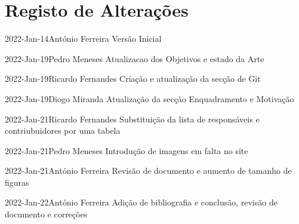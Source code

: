 \chapter*{Registo de Alterações}

\begin{logentry}{2022-Jan-14}{António Ferreira}
Versão Inicial
\end{logentry}

\begin{logentry}{2022-Jan-19}{Pedro Meneses}
Atualizacao dos Objetivos e estado da Arte
\end{logentry}

\begin{logentry}{2022-Jan-19}{Ricardo Fernandes}
Criação e atualização da secção de Git
\end{logentry}

\begin{logentry}{2022-Jan-19}{Diogo Miranda}
Atualização da secção Enquadramento e Motivação
\end{logentry}

\begin{logentry}{2022-Jan-21}{Ricardo Fernandes}
Substituição da lista de responsáveis e contriubuidores por uma tabela
\end{logentry}

\begin{logentry}{2022-Jan-21}{Pedro Meneses}
Introdução de imagens em falta no site
\end{logentry}

\begin{logentry}{2022-Jan-21}{António Ferreira}
Revisão de documento e aumento de tamanho de figuras
\end{logentry}

\begin{logentry}{2022-Jan-22}{António Ferreira}
Adição de bibliografia e conclusão, revisão de documento e correções
\end{logentry}